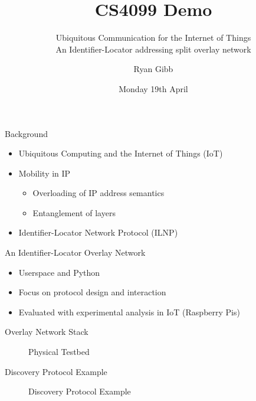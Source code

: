 \documentclass{beamer}
\title{CS4099 Demo}
\subtitle{Ubiquitous Communication for the Internet of Things\\An Identifier-Locator addressing split overlay network}
\author{Ryan Gibb}
\institute{School of Computer Science\\University of St Andrews}
\date{Monday 19th April}
\begin{document}
\begin{frame}
	\maketitle
\end{frame}

\begin{frame}{Background}
    \begin{itemize}    
        \item Ubiquitous Computing and the Internet of Things (IoT)
        \pause
        \item Mobility in IP
        \pause
        \begin{itemize}
            \item Overloading of IP address semantics
            \item Entanglement of layers
        \end{itemize}
        \pause
        \item Identifier-Locator Network Protocol (ILNP)
    \end{itemize}
\end{frame}

\begin{frame}{An Identifier-Locator Overlay Network}
    \begin{itemize}
        \item Userspace and Python
        \pause
        \item Focus on protocol design and interaction
        \pause
        \item Evaluated with experimental analysis in IoT (Raspberry Pis)
    \end{itemize}
\end{frame}

\begin{frame}{Overlay Network Stack}
    \begin{figure}[ht]
        \centering
        \scalebox{0.35}{}
        \caption{Physical Testbed}
        \label{fig:physical_testbed}
    \end{figure}
\end{frame}

\begin{frame}{Discovery Protocol Example}
\begin{figure}[ht]
    \centering
    \caption{Discovery Protocol Example}
    \label{fig:discovery}
\end{figure}
\end{frame}
\end{document}
